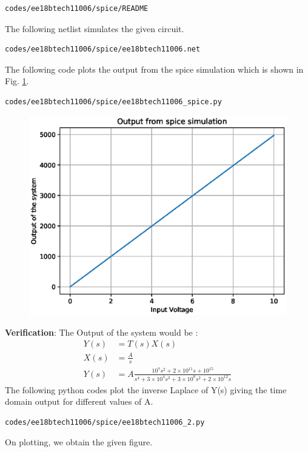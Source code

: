 \begin{enumerate}[label=\arabic*.,ref=\theenumi]
\begin{lstlisting}
codes/ee18btech11006/spice/README
\end{lstlisting}
The following netlist simulates the given circuit.
\begin{lstlisting}
codes/ee18btech11006/spice/ee18btech11006.net
\end{lstlisting}
The following code plots the output from the spice simulation which is shown in Fig. \ref{fig:ee18btech11006_8}.
\begin{lstlisting}
codes/ee18btech11006/spice/ee18btech11006_spice.py
\end{lstlisting}
\renewcommand{\thefigure}{\theenumi.\arabic{figure}}
%
\begin{figure}[!ht]
\centering
\includegraphics[width=\columnwidth]{./figs/ee18btech11006/ee18btech11006_8.eps}
\caption{}
\label{fig:ee18btech11006_8}
\end{figure}
\textbf{Verification}: The Output of the system would be :
\begin{align}
    Y(s)&=T(s)X(s)\\
    X(s)&=\frac{A}{s}\\
    Y(s)&=A\frac{10^7s^2+2\times10^{11}s+10^{15}}{s^4+3\times10^4s^3+3\times10^8s^2+2\times10^{12}s}
\end{align}
The following python codes plot the inverse Laplace of Y(s) giving the time domain output for different values of A.
\begin{lstlisting}
codes/ee18btech11006/spice/ee18btech11006_2.py
\end{lstlisting}
On plotting, we obtain the given figure.\\
\begin{figure}[!ht]

\end{figure}
\end{enumerate}
